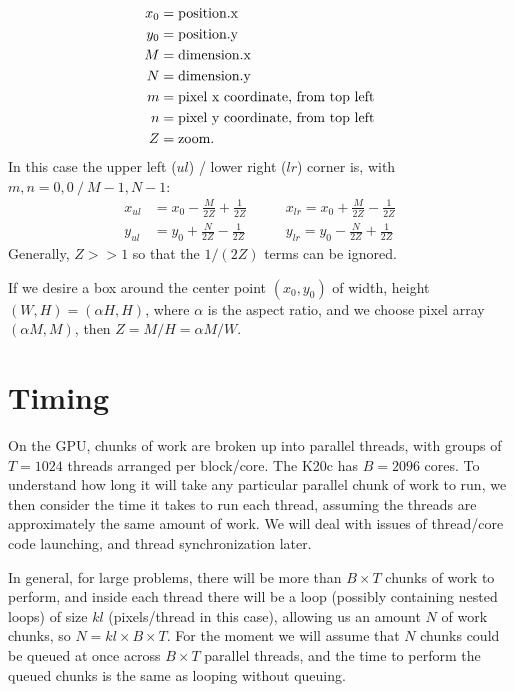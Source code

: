\documentclass[10pt]{article} %
\begin{document}
\begin{align*}
x_0 &= \hbox{\rm position.x}\\
y_0 &= \hbox{\rm position.y}\\
M &= \hbox{\rm dimension.x}\\
N &= \hbox{\rm dimension.y}\\
m &= \hbox{\rm pixel x coordinate, from top left}\\
n &= \hbox{\rm pixel y coordinate, from top left}\\
Z &= \hbox{\rm zoom.}
\end{align*}
In this case the upper left ($ul$) / lower right ($lr$) corner is, with $m,n=0,0\ /\ M-1, N-1$:
\begin{align}
x_{ul} &= x_0 - \frac{M}{2Z} + \frac{1}{2Z} \qquad &x_{lr} = x_0 + \frac{M}{2Z} - \frac{1}{2Z} \\
y_{ul} &= y_0 + \frac{N}{2Z} - \frac{1}{2Z} \qquad &y_{lr} = y_0 - \frac{N}{2Z} + \frac{1}{2Z}
\end{align}
Generally, $Z>>1$ so that the $1/(2Z)$ terms can be ignored.

If we desire a box around the center point $(x_0,y_0)$ of width, height $(W,H) = (\alpha H, H)$, where $\alpha$ is the aspect ratio, and we choose pixel array $(\alpha M, M)$, then $Z= M / H = \alpha M / W$. 
\section{Timing}
On the GPU, chunks of work are broken up into parallel threads, with groups of $T=1024$ threads arranged per block/core. The K20c has $B=2096$ cores. To understand how long it will take any particular parallel chunk of work to run, we then consider the time it takes to run each thread, assuming the threads are approximately the same amount of work. We will deal with issues of thread/core code launching,  and thread synchronization later. 

In general, for large problems, there will be more than $B\times T$ chunks of work to perform, and inside each thread there will be a loop (possibly containing nested loops) of size $kl$ (pixels/thread in this case), allowing us an amount $N$ of work chunks, so $N = kl\times B \times T$. For the moment we will assume that $N$ chunks could be queued at once across $B\times T$ parallel threads, and the time to perform the queued chunks is the same as looping without queuing. 
\end{document}
